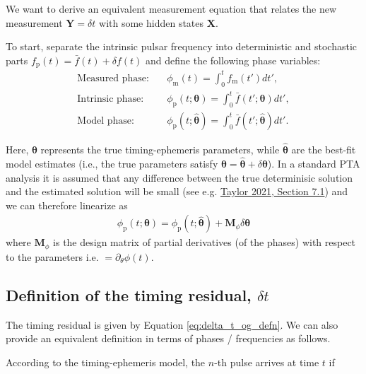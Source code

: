 \documentclass{tufte-handout} %
\begin{document}
\noindent We want to derive an equivalent measurement equation that relates the new measurement $\boldsymbol{Y} = \delta t$ with some hidden states $\boldsymbol{X}$. \newline 


\noindent To start, separate the intrinsic pulsar frequency into deterministic and stochastic parts $f_{\text{p}}(t) = \bar{f}(t) + \delta f(t)$ and define the following phase variables:
\begin{align}
	\text{Measured phase:} \quad & \phi_{\text{m}}(t) = \int_0^t f_{\text{m}}(t') dt', \label{eq:measured_phase}\\
	\text{Intrinsic phase:} \quad & \phi_{\text{p}}(t;\boldsymbol{\theta}) = \int_0^t \bar{f}(t'; \boldsymbol{\theta}) dt', \label{eq:model_phase} \\
	\text{Model phase:} \quad & \phi_{\text{p}}(t;\boldsymbol{\hat{\theta}}) = \int_0^t \bar{f}(t'; \boldsymbol{\hat{\theta}}) dt'.
\end{align}

Here, $\boldsymbol{\theta}$ represents the true timing-ephemeris parameters, while $\boldsymbol{\hat{\theta}}$ are the best-fit model estimates (i.e., the true parameters satisfy $\boldsymbol{\theta} = \boldsymbol{\hat{\theta}} + \delta \boldsymbol{\theta}$). In a standard PTA analysis it is assumed that any difference between the true determinisic solution and the estimated solution will be small (see e.g. \href{https://arxiv.org/abs/2105.13270}{Taylor 2021, Section 7.1}) and we can therefore linearize as
\begin{eqnarray}
\phi_{\text{p}}(t;\boldsymbol{\theta}) = \phi_{\text{p}}(t;\boldsymbol{\hat{\theta}}) + \mathbf{M}_{\phi} \delta \boldsymbol{\theta} \label{eq:MMatrix}
\end{eqnarray}
where $\mathbf{M}_{\phi}$ is the design matrix of partial derivatives (of the phases) with respect to the parameters i.e. $= \partial_{\theta} \phi(t)$. 

\subsection{Definition of the timing residual, $\delta t$}
The timing residual is given by Equation \eqref{eq:delta_t_og_defn}. We can also provide an equivalent definition in terms of phases / frequencies as follows. \newline 

\noindent According to the timing-ephemeris model, the $n$-th pulse arrives at time $t$ if 
\end{document}
